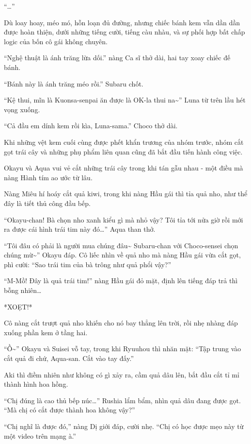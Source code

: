 \documentclass[../main.tex]{subfiles}
\begin{document}
``\dots''

Dù loay hoay, méo mó, hỗn loạn đủ đường, nhưng chiếc bánh kem vẫn dần dần được hoàn thiện, dưới những tiếng cười, tiếng càu nhàu, và sự phối hợp bất chấp logic của bốn cô gái không chuyên.

``Nghệ thuật là ánh trăng lừa dối.'' nàng Ca sĩ thở dài, hai tay xoay chiếc đế bánh.

``Bánh này là ánh trăng méo rồi.'' Subaru chốt.

``Kệ thui, mĩn là Kuonsa-senpai ăn được là OK-la thui na\~{}'' Luna từ trên lầu hét vọng xuống.

``Cả đầu em dính kem rồi kìa, Luna-sama.'' Choco thở dài.

\ct

Khi những vệt kem cuối cùng được phết khẩn trương của nhóm trước, nhóm cắt gọt trái cây và những phụ phẩm liên quan cũng đã bắt đầu tiến hành công việc.

Okayu và Aqua vui vẻ cắt những trái cây trong khi tán gẫu nhau - một điều mà nàng Hành tím ao ước từ lâu.

Nàng Miêu hí hoáy cắt quả kiwi, trong khi nàng Hầu gái thì tỉa quả nho, như thể đây là tiết thủ công đầu bếp.

``Okayu-chan! Bà chọn nho xanh kiểu gì mà nhỏ vậy? Tôi tỉa tới nửa giờ rồi mới ra được cái hình trái tim này đó\dots'' Aqua than thở.

``Tôi đâu có phải là người mua chúng đâu\~{} Subaru-chan với Choco-sensei chọn chúng mừ\~{}'' Okayu đáp. Cô liếc nhìn về quả nho mà nàng Hầu gái vừa cắt gọt, phì cười: ``Sao trái tim của bà trông như quả phổi vậy?''

``M-Mồ! Đây là quả trái tim!'' nàng Hầu gái đỏ mặt, định lên tiếng đáp trả thì bỗng nhiên\dots

*XOẸT!*

Cô nàng cắt trượt quả nho khiến cho nó bay thẳng lên trời, rồi nhẹ nhàng đáp xuống phần kem ở tầng hai.

``Ồ\~{}'' Okayu và Suisei vỗ tay, trong khi Ryuuhou thì nhăn mặt: ``Tập trung vào cắt quả đi chứ, Aqua-san. Cắt vào tay đấy.''

Aki thì điềm nhiên như không có gì xảy ra, cầm quả dâu lên, bắt đầu cắt tỉ mỉ thành hình hoa hồng.

``Chị đúng là cao thủ bếp núc\dots'' Rushia lẩm bẩm, nhìn quả dâu đang được gọt. ``Mà chị có cắt được thành hoa không vậy?''

``Chị nghĩ là được đó,'' nàng Dị giới đáp, cười nhẹ. ``Chị có học được mẹo này từ một video trên mạng à.''
\end{document}
